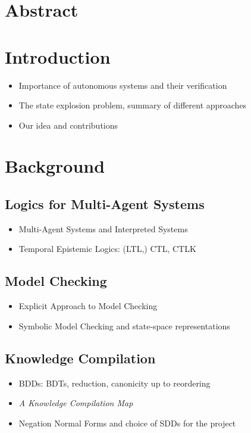 \documentclass[12]{article}
\begin{document}
\section*{Abstract}

\section{Introduction}

\begin{itemize}
\item Importance of autonomous systems and their verification
\item The state explosion problem, summary of different approaches
\item Our idea and contributions
\end{itemize}

\section{Background}

\subsection{Logics for Multi-Agent Systems}

\begin{itemize}
\item Multi-Agent Systems and Interpreted Systems
\item Temporal Epistemic Logics: (LTL,) CTL, CTLK
\end{itemize}

\subsection{Model Checking}

\begin{itemize}
\item Explicit Approach to Model Checking
\item Symbolic Model Checking and state-space representations
\end{itemize}


\subsection{Knowledge Compilation}

\begin{itemize}
\item BDDs: BDTs, reduction, canonicity up to reordering
\item \textit{A Knowledge Compilation Map}
\item Negation Normal Forms and choice of SDDs for the project
\end{itemize}
\end{document}
